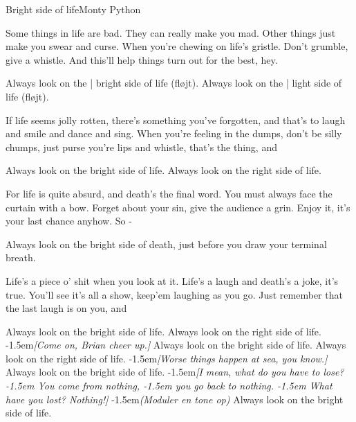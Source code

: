 \begin{sang}{Bright side of life}{Monty Python}
\begin{vers}
Some things in life are bad. 
They can really make you mad.
Other things just make you swear and
curse. 
When you're chewing on life's gristle. 
Don't grumble, give a whistle. 
And this'll help things turn out for the best, hey.
\end{vers}
\begin{omkvaed}
Always look on the | bright side of
life (fløjt). 
Always look on the | light side of
life (fløjt). 
\end{omkvaed}
\begin{vers}
If life seems jolly rotten,
there's something you've forgotten,
and that's to laugh and smile and dance and sing.
When you're feeling in the dumps,
don't be silly chumps,
just purse you're lips and whistle, that's the thing, and
\end{vers}
\begin{omkvaed}
Always look on the bright side of life.
Always look on the right side of life.
\end{omkvaed}
\begin{vers}
For life is quite absurd,
and death's the final word.
You must always face the curtain with a bow.
Forget about your sin,
give the audience a grin.
Enjoy it, it's your last chance anyhow. So -
\end{vers}
\begin{omkvaed}
Always look on the bright side of death,
just before you draw your terminal breath.
\end{omkvaed}
\vspace{10cm}
\begin{vers}
Life's a piece o' shit
when you look at it.
Life's a laugh and death's a joke, it's true.
You'll see it's all a show,
keep'em laughing as you go.
Just remember that the last laugh is on you, and
\end{vers}
\begin{omkvaed}
Always look on the bright side of life.
Always look on the right side of life.
\vspace*{-.5\baselineskip}
\kern-1.5em\emph{[Come on, Brian cheer up.]}
\vspace*{-.5\baselineskip}
Always look on the bright side of life.
Always look on the right side of life.
\vspace*{-.5\baselineskip}
\kern-1.5em\emph{[Worse things happen at sea, you know.]}
\vspace*{-.5\baselineskip}
Always look on the bright side of life.
\vspace*{-.5\baselineskip}
\kern-1.5em\emph{[I mean, what do you have to lose?
\kern-1.5em You come from nothing,
\kern-1.5em you go back to nothing.
\kern-1.5em What have you lost? Nothing!]}
\vspace*{-.5\baselineskip}
\kern-1.5em\emph{(Moduler en tone op)}
Always look on the bright side of life.
\end{omkvaed}
\laps
\end{sang}
